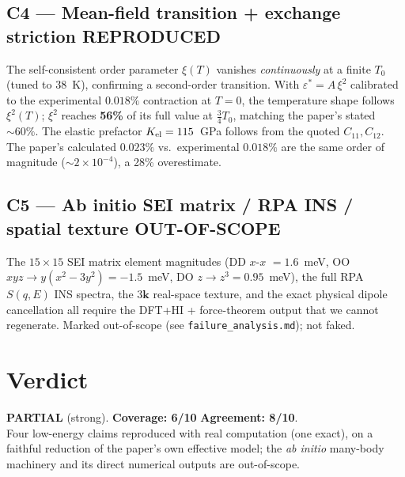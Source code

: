 \documentclass[11pt]{article}
\newcommand{\reprod}{\textcolor{green!55!black}{\textbf{REPRODUCED}}}
\newcommand{\oosc}{\textcolor{blue!70!black}{\textbf{OUT-OF-SCOPE}}}
\begin{document}
\subsection*{C4 --- Mean-field transition + exchange striction \reprod}
The self-consistent order parameter $\xi(T)$ vanishes \emph{continuously} at a
finite $T_0$ (tuned to $38$~K), confirming a second-order transition. With
$\varepsilon^*=A\,\xi^2$ calibrated to the experimental $0.018\%$ contraction at
$T=0$, the temperature shape follows $\xi^2(T)$; $\xi^2$ reaches \textbf{56\%} of
its full value at $\tfrac34 T_0$, matching the paper's stated $\sim\!60\%$. The
elastic prefactor $K_{\rm el}=115$~GPa follows from the quoted $C_{11},C_{12}$.
The paper's calculated $0.023\%$ vs.\ experimental $0.018\%$ are the same order of
magnitude ($\sim2\times10^{-4}$), a 28\% overestimate.

\subsection*{C5 --- Ab initio SEI matrix / RPA INS / spatial texture \oosc}
The $15\times15$ SEI matrix element magnitudes (DD $x$-$x$ $=1.6$~meV, OO
$xyz\!\to\!y(x^2-3y^2)=-1.5$~meV, DO $z\!\to\!z^3=0.95$~meV), the full RPA
$S(q,E)$ INS spectra, the $3\mathbf{k}$ real-space texture, and the exact physical
dipole cancellation all require the DFT+HI + force-theorem output that we cannot
regenerate. Marked out-of-scope (see \texttt{failure\_analysis.md}); not faked.

\section{Verdict}
\textbf{PARTIAL} (strong). \quad \textbf{Coverage: 6/10} \quad
\textbf{Agreement: 8/10}.\\
Four low-energy claims reproduced with real computation (one exact), on a
faithful reduction of the paper's own effective model; the \emph{ab initio}
many-body machinery and its direct numerical outputs are out-of-scope.
\end{document}
